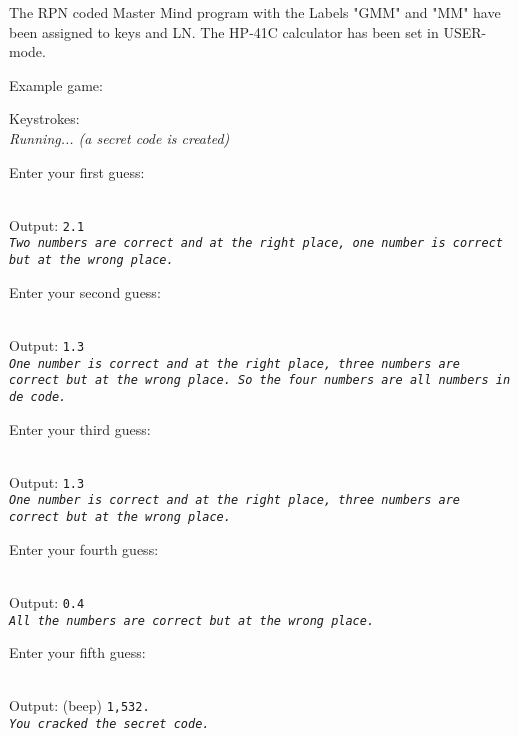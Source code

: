 \documentclass[a4paper, landscape]{article}
\begin{document}
\bigskip

The RPN coded Master Mind program with the Labels "GMM" and "MM" have been assigned to keys 
\SIGMAplusfoc and LN.
The HP-41C calculator has been set in USER-mode.

\bigskip
Example game:

\bigskip
Keystrokes:
\SIGMAplusfo
\\
\it { Running... (a secret code is created)}
\rm

\bigskip
Enter your first guess:\\
\tt
{} \\
\LNfo
\rm

\bigskip
Output: 
\tt 2.1 \\
\it
Two numbers are correct and at the right place, 
one number is correct but at the wrong place.
\rm

\bigskip
Enter your second guess: \\
\tt
{} \\
\LNfo 
\rm

\bigskip
Output: 
\tt 1.3 \\
\it
One number is correct and at the right place, 
three numbers are correct but at the wrong place.
So the four numbers are all numbers in de code.
\rm

\clearpage

\bigskip
Enter your third guess: \\
\tt
{} \\
\LNfo
\rm

\bigskip
Output: 
\tt 1.3 \\
\it
One number is correct and at the right place, 
three numbers are correct but at the wrong place.
\rm

\bigskip
Enter your fourth guess: \\
\tt
{}  \\
\LNfo
\rm

\bigskip
Output: 
\tt 0.4 \\
\it
All the numbers are correct but at the wrong place.
\rm


\bigskip
Enter your fifth guess: \\
\tt
{} \\
\LNfo
\rm

\bigskip
Output: (beep)
\tt 1,532. \\
\it
You cracked the secret code.
\rm
\bigskip
\end{document}

